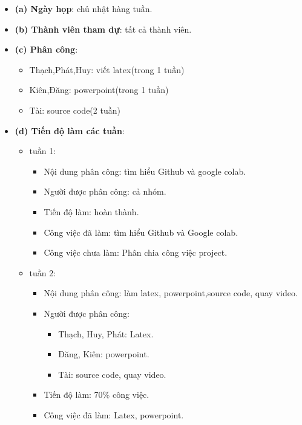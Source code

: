 \documentclass{article}
\begin{document}
\begin{itemize}
    \item \textbf{(a) Ngày họp}: chủ nhật hàng tuần.
    \item \textbf{(b) Thành viên tham dự}: tất cả thành viên.
    \item \textbf{(c) Phân công}:
        \begin{itemize}
            \item Thạch,Phát,Huy: viết latex(trong 1 tuần)
            \item Kiên,Đăng: powerpoint(trong 1 tuần)
            \item Tài: source code(2 tuần)
        \end{itemize}
    \item \textbf{(d) Tiến độ làm các tuần}:
        \begin{itemize}
            \item tuần 1:
                \begin{itemize}
                    \item Nội dung phân công: tìm hiểu Github và google colab.
                    \item Người được phân công: cả nhóm.
                    \item Tiến độ làm: hoàn thành.
                    \item Công việc đã làm: tìm hiểu Github và Google colab.
                    \item Công việc chưa làm: Phân chia công việc project.
                \end{itemize}
            \item tuần 2:
                \begin{itemize}
                    \item Nội dung phân công: làm latex, powerpoint,source code, quay video.
                    \item Người được phân công:
                        \begin{itemize}
                            \item Thạch, Huy, Phát: Latex.
                            \item Đăng, Kiên: powerpoint.
                            \item Tài: source code, quay video.
                        \end{itemize}
                    \item Tiến độ làm: 70\% công việc.
                    \item Công việc đã làm: Latex, powerpoint.

\end{itemize}
\end{itemize}
\end{itemize}
\end{document}
